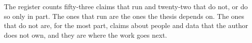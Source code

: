 \documentclass[11pt,a4paper]{article}
\renewcommand{\_}{\oldunderscore\allowbreak}
\theoremstyle{plain}
\theoremstyle{definition}
\theoremstyle{remark}
\begin{document}
The register counts fifty-three claims that run and twenty-two that do not, or do so only in part. The ones
that run are the ones the thesis depends on. The ones that do not are, for the most part, claims about people
and data that the author does not own, and they are where the work goes next.



\end{document}
